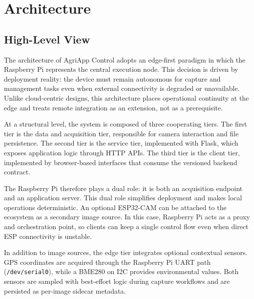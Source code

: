 \section{Architecture}

\subsection{High-Level View}
The architecture of AgriApp Control adopts an edge-first paradigm in which the Raspberry Pi represents the central execution node. This decision is driven by deployment reality: the device must remain autonomous for capture and management tasks even when external connectivity is degraded or unavailable. Unlike cloud-centric designs, this architecture places operational continuity at the edge and treats remote integration as an extension, not as a prerequisite.

At a structural level, the system is composed of three cooperating tiers. The first tier is the data and acquisition tier, responsible for camera interaction and file persistence. The second tier is the service tier, implemented with Flask, which exposes application logic through HTTP APIs. The third tier is the client tier, implemented by browser-based interfaces that consume the versioned backend contract.

The Raspberry Pi therefore plays a dual role: it is both an acquisition endpoint and an application server. This dual role simplifies deployment and makes local operations deterministic. An optional ESP32-CAM can be attached to the ecosystem as a secondary image source. In this case, Raspberry Pi acts as a proxy and orchestration point, so clients can keep a single control flow even when direct ESP connectivity is unstable.

In addition to image sources, the edge tier integrates optional contextual sensors. GPS coordinates are acquired through the Raspberry Pi UART path (\texttt{/dev/serial0}), while a BME280 on I2C provides environmental values. Both sensors are sampled with best-effort logic during capture workflows and are persisted as per-image sidecar metadata.

